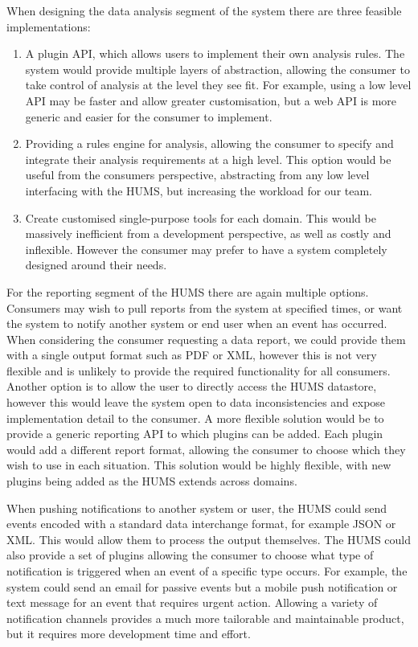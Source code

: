 \documentclass[10pt,a4paper]{article}
\begin{document}
When designing the data analysis segment of the system there are three feasible
implementations:
\begin{enumerate}
	\item A plugin API, which allows users to implement their own analysis rules.
	      The system would provide multiple layers of abstraction, allowing the
	      consumer to take control of analysis at the level they see fit. For
	      example, using a low level API may be faster and allow greater
	      customisation, but a web API is more generic and easier for the consumer
	      to implement.
	\item Providing a rules engine for analysis, allowing the consumer to specify
	      and integrate their analysis requirements at a high level. This option
	      would be useful from the consumers perspective, abstracting from any low
	      level interfacing with the HUMS, but increasing the workload for our
	      team.
	\item Create customised single-purpose tools for each domain. This would be
	      massively inefficient from a development perspective, as well as costly
	      and inflexible. However the consumer may prefer to have a system
	      completely designed around their needs. 
\end{enumerate}
For the reporting segment of the HUMS there are again multiple options.
Consumers may wish to pull reports from the system at specified times, or want
the system to notify another system or end user when an event has occurred. When
considering the consumer requesting a data report, we could provide them with a
single output format such as PDF or XML, however this is not very flexible and
is unlikely to provide the required functionality for all consumers. Another
option is to allow the user to directly access the HUMS datastore, however this
would leave the system open to data inconsistencies and expose implementation
detail to the consumer. A more flexible solution would be to provide a generic
reporting API to which plugins can be added. Each plugin would add a different
report format, allowing the consumer to choose which they wish to use in each
situation. This solution would be highly flexible, with new plugins being added
as the HUMS extends across domains.

When pushing notifications to another system or user, the HUMS could send events
encoded with a standard data interchange format, for example JSON or XML. This
would allow them to process the output themselves. The HUMS could also provide a
set of plugins allowing the consumer to choose what type of notification is
triggered when an event of a specific type occurs. For example, the system could
send an email for passive events but a mobile push notification or text message
for an event that requires urgent action. Allowing a variety of notification
channels provides a much more tailorable and maintainable product, but it
requires more development time and effort.
\end{document}
